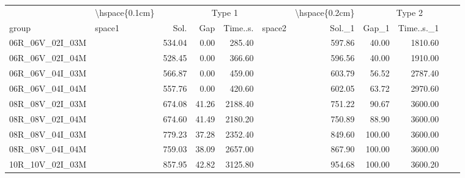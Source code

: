 
\begin{tabular}{llrrrlrrr}
\toprule
\multicolumn{1}{c}{} & \multicolumn{1}{c}{\textbackslash{}hspace\{0.1cm\}} & \multicolumn{4}{c}{Type 1} & \multicolumn{1}{c}{\textbackslash{}hspace\{0.2cm\}} & \multicolumn{4}{c}{Type 2} \\
\cmidrule(l{3pt}r{3pt}){2-2} \cmidrule(l{3pt}r{3pt}){3-6} \cmidrule(l{3pt}r{3pt}){7-7} \cmidrule(l{3pt}r{3pt}){8-11}
group & space1 & Sol. & Gap & Time..s. & space2 & Sol.\_1 & Gap\_1 & Time..s.\_1\\
\midrule
06R\_06V\_02I\_03M & \hspace{0.1cm} & 534.04 & 0.00 & 285.40 & \hspace{0.2cm} & 597.86 & 40.00 & 1810.60\\
06R\_06V\_02I\_04M & \hspace{0.1cm} & 528.45 & 0.00 & 366.60 & \hspace{0.2cm} & 596.56 & 40.00 & 1910.00\\
06R\_06V\_04I\_03M & \hspace{0.1cm} & 566.87 & 0.00 & 459.00 & \hspace{0.2cm} & 603.79 & 56.52 & 2787.40\\
06R\_06V\_04I\_04M & \hspace{0.1cm} & 557.76 & 0.00 & 420.60 & \hspace{0.2cm} & 602.05 & 63.72 & 2970.60\\
\addlinespace
08R\_08V\_02I\_03M & \hspace{0.1cm} & 674.08 & 41.26 & 2188.40 & \hspace{0.2cm} & 751.22 & 90.67 & 3600.00\\
08R\_08V\_02I\_04M & \hspace{0.1cm} & 674.60 & 41.49 & 2180.20 & \hspace{0.2cm} & 750.89 & 88.90 & 3600.00\\
08R\_08V\_04I\_03M & \hspace{0.1cm} & 779.23 & 37.28 & 2352.40 & \hspace{0.2cm} & 849.60 & 100.00 & 3600.00\\
08R\_08V\_04I\_04M & \hspace{0.1cm} & 759.03 & 38.09 & 2657.00 & \hspace{0.2cm} & 867.90 & 100.00 & 3600.00\\
\addlinespace
10R\_10V\_02I\_03M & \hspace{0.1cm} & 857.95 & 42.82 & 3125.80 & \hspace{0.2cm} & 954.68 & 100.00 & 3600.20\\

\end{tabular}

